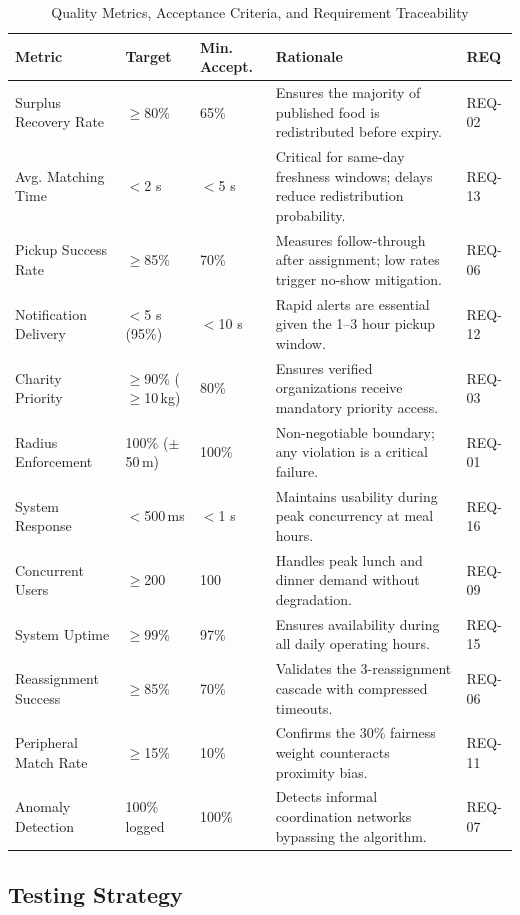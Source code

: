 \documentclass[conference]{IEEEtran}
\begin{document}
\begin{table}[h]
\centering
\caption{Quality Metrics, Acceptance Criteria, and Requirement Traceability}
\label{tab:qa_metrics}
\begin{tabular}{|p{2.8cm}|p{2cm}|p{2cm}|p{7cm}|p{1cm}|}
\hline
\textbf{Metric} & \textbf{Target} & \textbf{Min. Accept.} & \textbf{Rationale} & \textbf{REQ} \\
\hline
Surplus Recovery Rate & $\geq$80\% & 65\% & Ensures the majority of published food is redistributed before expiry. & REQ-02 \\
\hline
Avg. Matching Time & $<$2 s & $<$5 s & Critical for same-day freshness windows; delays reduce redistribution probability. & REQ-13 \\
\hline
Pickup Success Rate & $\geq$85\% & 70\% & Measures follow-through after assignment; low rates trigger no-show mitigation. & REQ-06 \\
\hline
Notification Delivery & $<$5 s (95\%) & $<$10 s & Rapid alerts are essential given the 1--3 hour pickup window. & REQ-12 \\
\hline
Charity Priority & $\geq$90\% ($\geq$10\,kg) & 80\% & Ensures verified organizations receive mandatory priority access. & REQ-03 \\
\hline
Radius Enforcement & 100\% ($\pm$50\,m) & 100\% & Non-negotiable boundary; any violation is a critical failure. & REQ-01 \\
\hline
System Response & $<$500\,ms & $<$1 s & Maintains usability during peak concurrency at meal hours. & REQ-16 \\
\hline
Concurrent Users & $\geq$200 & 100 & Handles peak lunch and dinner demand without degradation. & REQ-09 \\
\hline
System Uptime & $\geq$99\% & 97\% & Ensures availability during all daily operating hours. & REQ-15 \\
\hline
Reassignment Success & $\geq$85\% & 70\% & Validates the 3-reassignment cascade with compressed timeouts. & REQ-06 \\
\hline
Peripheral Match Rate & $\geq$15\% & 10\% & Confirms the 30\% fairness weight counteracts proximity bias. & REQ-11 \\
\hline
Anomaly Detection & 100\% logged & 100\% & Detects informal coordination networks bypassing the algorithm. & REQ-07 \\
\hline
\end{tabular}
\end{table}

\subsection{Testing Strategy}
\end{document}
